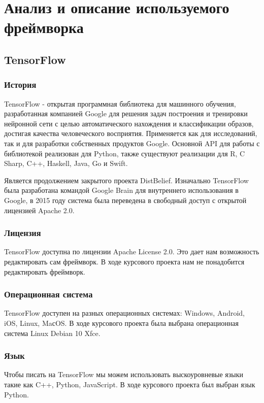 \section{Анализ и описание используемого фреймворка}

\subsection{TensorFlow}

\subsubsection{История}
TensorFlow - открытая программная библиотека для машинного обучения,
разработанная компанией Google для решения задач построения и тренировки нейронной сети
с целью автоматического нахождения и классификации образов,
достигая качества человеческого восприятия.
Применяется как для исследований,
так и для разработки собственных продуктов Google.
Основной API для работы с библиотекой реализован для Python,
также существуют реализации для R, C Sharp, C++, Haskell, Java, Go и Swift.

Является продолжением закрытого проекта DistBelief.
Изначально TensorFlow была разработана командой Google Brain для внутреннего использования в Google,
в 2015 году система была переведена в свободный доступ с открытой лицензией Apache 2.0. 

\subsubsection{Лицензия}
TensorFlow доступна по лицензии Apache License 2.0.
Это дает нам возможность редактировать сам фреймворк.
В ходе курсового проекта нам не понадобится редактировать фреймворк.

\subsubsection{Операционная система}
TensorFlow доступен на разных операционных системах:
Windows, Android, iOS, Linux, MaсOS.
В ходе курсового проекта была выбрана операционная система Linux Debian 10 Xfce.

\subsubsection{Язык}
Чтобы писать на TensorFlow мы можем использовать выскоуровневые языки
такие как C++, Python, JavaScript.
В ходе курсового проекта был выбран язык Python.

